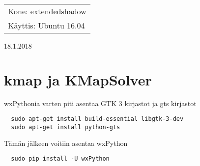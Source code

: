 \documentclass[main.tex]{subfiles}
\begin{document}
\thispagestyle{empty}
\begin{tabular}[t]{l}
Kone: extendedshadow\\
Käyttis: Ubuntu 16.04
\end{tabular}
\hfill 18.1.2018

\section{kmap ja KMapSolver}
wxPythonia varten piti asentaa GTK 3 kirjastot ja gts kirjastot

\begin{lstlisting}
  sudo apt-get install build-essential libgtk-3-dev
  sudo apt-get install python-gts
\end{lstlisting}

Tämän jälkeen voitiin asentaa wxPython

\begin{lstlisting}
  sudo pip install -U wxPython
\end{lstlisting}
\end{document}
